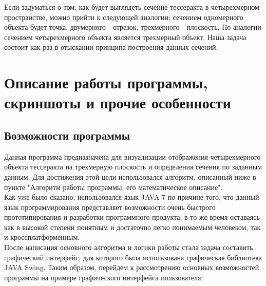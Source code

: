 \documentclass[12pt, a4paper, twoside]{report}
\begin{document}
Если задуматься о том, как будет выглядеть сечение тессеракта в четырехмерном пространстве, можно прийти к следующей аналогии: сечением одномерного объекта будет точка, двумерного -  отрезок, трехмерного - плоскость. По аналогии сечением четырехмерного объекта является трехмерный объект. Наша задача состоит как раз в отыскании принципа построения данных сечений.

\section{Описание работы программы, скриншоты и прочие особенности}
\subsection{Возможности программы}
Данная программа предназначена для визуализации отображения четырехмерного объекта тессеракта на трехмерную плоскость и определения сечения по заданным данным. Для достижения этой цели использовался алгоритм, описанный ниже в пункте "Алгоритм работы программы, его математическое описание". \\
Как уже было сказано, использовался язык JAVA 7 по причине того, что данный язык программирования представляет возможности очень быстрого прототипирования и разработки программного продукта, в то же время оставаясь как в высокой степени понятным и достаточно легко понимаемым человеком, так и кроссплатформенным. \\
После написания основного алгоритма и логики работы стала задача составить графический интерфейс, для которого была использована графическая библиотека JAVA Swing. Таким образом, перейдем к рассмотрению основных возможностей программы на примере графического интерфейса пользователя:
\\

\end{document}
